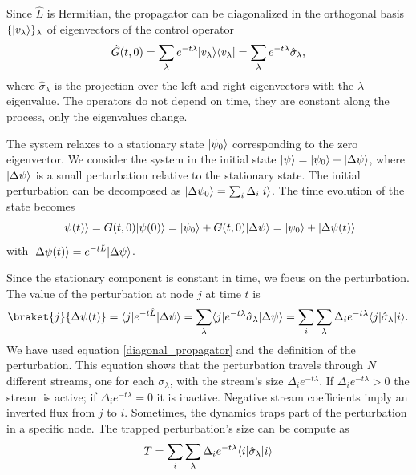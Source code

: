 Since $\hat L$ is Hermitian, the propagator can be diagonalized in the orthogonal basis $\{\lvert v_\lambda\rangle\}_\lambda$ of eigenvectors of the control operator
\begin{equation}\label{diagonal_propagator}
    \hat G(t,0) = \sum_\lambda e^{-t\lambda} \lvert v_\lambda\rangle\langle v_\lambda\rvert = \sum_\lambda e^{-t\lambda} \hat \sigma_\lambda,
\end{equation}
where $\hat \sigma_\lambda$ is the projection over the left and right eigenvectors with the $\lambda$ eigenvalue. The operators do not depend on time, they are constant along the process, only the eigenvalues change.

The system relaxes to a stationary state $\lvert\psi_0\rangle$ corresponding to the zero eigenvector.
We consider the system in the initial state $\lvert\psi\rangle = \lvert\psi_0\rangle + \lvert\Delta\psi\rangle$, where $\lvert\Delta\psi\rangle$ is a small perturbation relative to the stationary state. The initial perturbation can be decomposed as $\lvert\Delta\psi_0\rangle = \sum_i \Delta_i \lvert i\rangle$.
The time evolution of the state becomes
\begin{equation}
    \lvert\psi(t)\rangle = G(t,0) \lvert\psi(0)\rangle = \lvert\psi_0\rangle + G(t,0)\lvert\Delta\psi\rangle = \lvert\psi_0\rangle + \lvert\Delta\psi(t)\rangle
\end{equation}
with $\lvert\Delta\psi(t)\rangle = e^{-t\hat L} \lvert\Delta \psi\rangle$.

Since the stationary component is constant in time, we focus on the perturbation. 
The value of the perturbation at node $j$ at time $t$ is
\begin{equation}
    \braket{j}{\Delta\psi(t)} = \bra{j} e^{-t\hat L} \ket{\Delta\psi} =\sum_\lambda \bra{j} e^{-t\lambda} \hat \sigma_\lambda\ket{\Delta\psi} = \sum_i  \sum_\lambda \Delta_i e^{-t\lambda} \bra{j}  \hat \sigma_\lambda \ket{i}.
\end{equation}
We have used equation \eqref{diagonal_propagator} and the definition of the perturbation.
This equation shows that the perturbation travels through $N$ different streams, one for each $\sigma_\lambda$, with the stream's size $\Delta_i e^{-t\lambda}$. If $\Delta_i e^{-t\lambda} > 0$ the stream is active; if $\Delta_i e^{-t\lambda} = 0$ it is inactive. Negative stream coefficients imply an inverted flux from $j$ to $i$.
Sometimes, the dynamics traps part of the perturbation in a specific node. The trapped perturbation's size can be compute as
\begin{equation}
    T = \sum_i  \sum_\lambda \Delta_i e^{-t\lambda} \langle i\rvert  \hat \sigma_\lambda \lvert i\rangle 
\end{equation} 


